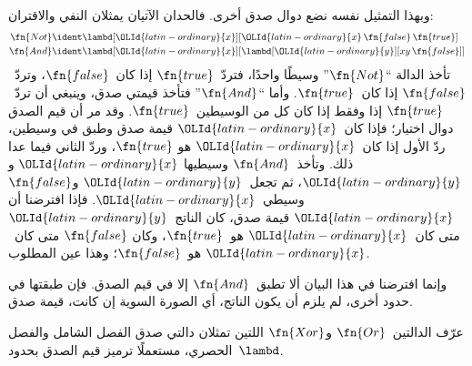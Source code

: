 \documentclass[../../../include/open-logic-section]{subfiles}
\begin{document}
وبهذا التمثيل نفسه نضع دوال صدق أخرى. فالحدان الآتيان يمثلان النفي
والاقتران:
\begin{align*}
  \fn{Not} & \ident \lambd[\OLId{latin-ordinary}{x}][\OLId{latin-ordinary}{x}\, \fn{false}\, \fn{true}]\\
  \fn{And} & \ident \lambd[\OLId{latin-ordinary}{x}][\lambd[\OLId{latin-ordinary}{y}][xy \,\fn{false}]]
\end{align*}
تأخذ الدالة ``$\fn{Not}$'' وسيطًا واحدًا، فتردّ~$\fn{true}$ إذا
كان~$\fn{false}$، وتردّ~$\fn{false}$ إذا كان~$\fn{true}$. وأما
``$\fn{And}$'' فتأخذ قيمتي صدق، وينبغي أن تردّ~$\fn{true}$ إذا وفقط
إذا كان كل من الوسيطين~$\fn{true}$. وقد مر أن قيم الصدق دوال اختيار؛
فإذا كان~$\OLId{latin-ordinary}{x}$ قيمة صدق وطبق في وسيطين، ردّ الأول إذا كان~$\OLId{latin-ordinary}{x}$ هو
$\fn{true}$، وردّ الثاني فيما عدا ذلك. وتأخذ~$\fn{And}$ وسيطيها
$\OLId{latin-ordinary}{x}$ و$\OLId{latin-ordinary}{y}$، ثم تجعل~$\OLId{latin-ordinary}{y}$ و$\fn{false}$ وسيطي~$\OLId{latin-ordinary}{x}$. فإذا افترضنا أن
$\OLId{latin-ordinary}{x}$ قيمة صدق، كان الناتج~$\OLId{latin-ordinary}{y}$ متى كان~$\OLId{latin-ordinary}{x}$ هو~$\fn{true}$، وكان
$\fn{false}$ متى كان~$\OLId{latin-ordinary}{x}$ هو~$\fn{false}$؛ وهذا عين المطلوب.

وإنما افترضنا في هذا البيان ألا تطبق~$\fn{And}$ إلا في قيم الصدق.
فإن طبقتها في حدود أخرى، لم يلزم أن يكون الناتج، أي الصورة السوية إن
كانت، قيمة صدق.

\begin{prob}
  عرّف الدالتين~$\fn{Or}$ و$\fn{Xor}$ اللتين تمثلان دالتي صدق الفصل
  الشامل والفصل الحصري، مستعملًا ترميز قيم الصدق بحدود~$\lambd$.
\end{prob}
\end{document}
